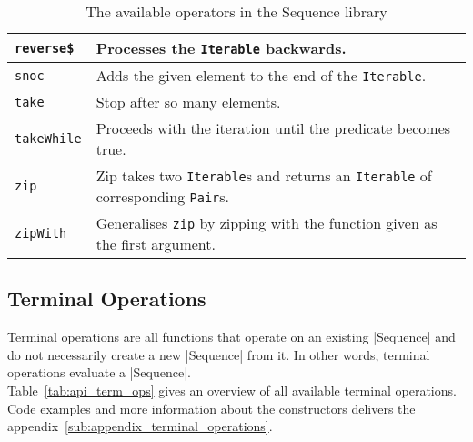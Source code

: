 \begin{table}[H]
\begin{tabularx}{\textwidth}{| l | X |}
    \texttt{reverse\$} & Processes the \texttt{Iterable} backwards. \\ \hline 
    \texttt{snoc} & Adds the given element to the end of the \texttt{Iterable}. \\ \hline 
    \texttt{take} & Stop after so many elements. \\ \hline 
    \texttt{takeWhile} & Proceeds with the iteration until the predicate becomes true. \\ \hline 
    \texttt{zip} & Zip takes two \texttt{Iterable}s and returns an \texttt{Iterable} of corresponding \texttt{Pair}s. \\ \hline 
    \texttt{zipWith} & Generalises \texttt{zip} by zipping with the function given as the first argument. \\ \hline 
  \end{tabularx}
  \caption{The available operators in the Sequence library}
  \label{tab:api_operators}
\end{table}

\subsection{Terminal Operations} %
\label{sub:Terminal Operations}
Terminal operations are all functions that operate on an existing |Sequence|
and do not necessarily create a new |Sequence| from it. In other words,
terminal operations evaluate a |Sequence|.\\ 
Table~\ref{tab:api_term_ops} gives an overview of all available terminal
operations.\\
Code examples and more information about the constructors delivers the
appendix~\ref{sub:appendix_terminal_operations}.

